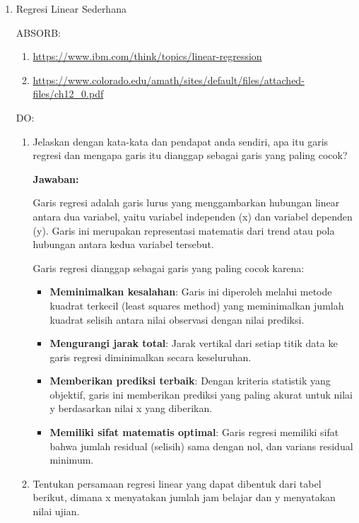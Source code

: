 \documentclass[a4paper]{article}
\begin{document}
\pagestyle{empty}

\begin{enumerate}[itemsep=1em,leftmargin=*]
  \item Regresi Linear Sederhana
  
  ABSORB:

  \begin{enumerate}
    \item \url{https://www.ibm.com/think/topics/linear-regression}
    \item \url{https://www.colorado.edu/amath/sites/default/files/attached-files/ch12_0.pdf}
  \end{enumerate}

  DO:

  \begin{enumerate}
    \item Jelaskan dengan kata-kata dan pendapat anda sendiri, apa itu garis regresi dan mengapa garis itu dianggap sebagai garis yang paling cocok?
    
    \textbf{Jawaban:}
    
    Garis regresi adalah garis lurus yang menggambarkan hubungan linear antara dua variabel, yaitu variabel independen (x) dan variabel dependen (y). Garis ini merupakan representasi matematis dari trend atau pola hubungan antara kedua variabel tersebut.
    
    Garis regresi dianggap sebagai garis yang paling cocok karena:
    \begin{itemize}
      \item \textbf{Meminimalkan kesalahan}: Garis ini diperoleh melalui metode kuadrat terkecil (least squares method) yang meminimalkan jumlah kuadrat selisih antara nilai observasi dengan nilai prediksi.
      \item \textbf{Mengurangi jarak total}: Jarak vertikal dari setiap titik data ke garis regresi diminimalkan secara keseluruhan.
      \item \textbf{Memberikan prediksi terbaik}: Dengan kriteria statistik yang objektif, garis ini memberikan prediksi yang paling akurat untuk nilai y berdasarkan nilai x yang diberikan.
      \item \textbf{Memiliki sifat matematis optimal}: Garis regresi memiliki sifat bahwa jumlah residual (selisih) sama dengan nol, dan varians residual minimum.
    \end{itemize}
    

    \item Tentukan persamaan regresi linear yang dapat dibentuk dari tabel berikut, dimana x menyatakan jumlah jam belajar dan y menyatakan nilai ujian.
    

\end{enumerate}
\end{enumerate}
\end{document}
